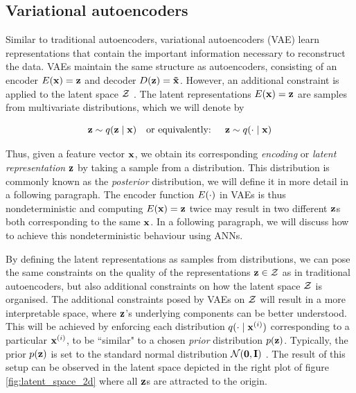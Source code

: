 \subsection{Variational autoencoders} \label{cha:bg_vae}

Similar to traditional autoencoders, variational autoencoders (VAE) learn representations that contain the important information necessary to reconstruct the data. VAEs maintain the same structure as autoencoders, consisting of an encoder $E(\mathbf{x}) = \mathbf{z}$ and decoder $D(\mathbf{z}) = \mathbf{\tilde{x}}$. However, an additional constraint is applied to the latent space $\mathcal{Z}$ \citep{doerschTutorialVariationalAutoencoders2021, davidfosterVariationalAutoencoders2023, kingmaAutoEncodingVariationalBayes2022, kingmaIntroductionVariationalAutoencoders2019, cinelliVariationalMethodsMachine2021}. The latent representations $E(\mathbf{x}) = \mathbf{z}$ are samples from multivariate distributions, which we will denote by 

$$\mathbf{z} \sim q (\mathbf{z} \mid \mathbf{x}) \quad \text{or equivalently: } \quad \mathbf{z} \sim q (\cdot \mid \mathbf{x})$$

Thus, given a feature vector $\mathbf{x}$, we obtain its corresponding \textit{encoding} or \textit{latent representation} $\mathbf{z}$ by taking a sample from a distribution. This distribution is commonly known as the \textit{posterior} distribution, we will define it in more detail in a following paragraph. The encoder function $E(\cdot)$ in VAEs is thus nondeterministic and computing $E(\mathbf{x}) = \mathbf{z}$ twice may result in two different $\mathbf{z}$s both corresponding to the same $\mathbf{x}$. In a following paragraph, we will discuss how to achieve this nondeterministic behaviour using ANNs.

By defining the latent representations as samples from distributions, we can pose the same constraints on the quality of the representations $\mathbf{z} \in \mathcal{Z}$ as in traditional autoencoders, but also additional constraints on how the latent space $\mathcal{Z}$ is organised. The additional constraints posed by VAEs on $\mathcal{Z}$ will result in a more interpretable space, where $\mathbf{z}$'s underlying components can be better understood. This will be achieved by enforcing each distribution $q ( \cdot \mid \mathbf{x}^{(i)})$ corresponding to a particular $\mathbf{x}^{(i)}$, to be ``similar" to a chosen \textit{prior} distribution $p(\mathbf{z})$. Typically, the prior $p(\mathbf{z})$ is set to the standard normal distribution $\mathcal{N}(\bm{\mathbf{0}}, \mathbf{I})$ \citep{davidfosterVariationalAutoencoders2023}. The result of this setup can be observed in the latent space depicted in the right plot of figure \ref{fig:latent_space_2d} where all $\mathbf{z}$s are attracted to the origin.

